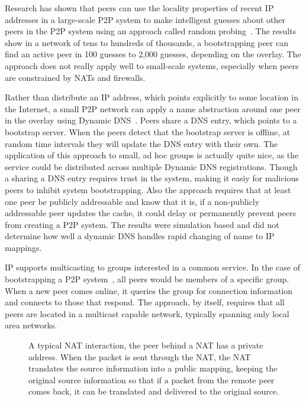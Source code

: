 \documentclass[conference]{IEEEtran}
\begin{document}
Research has shown that peers can use the locality properties of recent IP
addresses in a large-scale P2P system to make intelligent guesses about other
peers in the P2P system using an approach called random
probing~\cite{bootstrapping_p2p, locality_aware}.  The results show in a
network of tens to hundreds of thousands, a bootstrapping peer can find an
active peer in 100 guesses to 2,000 guesses, depending on the overlay.  The
approach does not really apply well to small-scale systems, especially when
peers are constrained by NATs and firewalls.

Rather than distribute an IP address, which points explicitly to some location
in the Internet, a small P2P network can apply a name abstraction around one
peer in the overlay using Dynamic DNS~\cite{bootstrapping_ddns}.  Peers share a
DNS entry, which points to a bootstrap server.  When the peers detect that the
bootstrap server is offline, at random time intervals they will update the DNS
entry with their own.  The application of this approach to small, ad hoc groups
is actually quite nice, as the service could be distributed across multiple
Dynamic DNS registrations.  Though a sharing a DNS entry requires trust in the
system, making it easiy for malicious peers to inhibit system bootstrapping.
Also the approach requires that at least one peer be publicly addressable and
know that it is, if a non-publicly addressable peer updates the cache, it could
delay or permanently prevent peers from creating a P2P system.  The results
were simulation based and did not determine how well a dynamic DNS handles
rapid changing of name to IP mappings.

IP supports multicasting to groups interested in a common service.  In the case
of bootstrapping a P2P system~\cite{pastry, locality_aware}, all peers would be
members of a specific group.  When a new peer comes online, it queries the
group for connection information and connects to those that respond.  The
approach, by itself, requires that all peers are located in a multicast capable
network, typically spanning only local area networks.

\begin{figure*}[h!t!]
\centering
{}
\caption{A typical NAT interaction, the peer behind a NAT has a private address.
When the packet is sent through the NAT, the NAT translates the source information
into a public mapping, keeping the original source information so that if a
packet from the remote peer comes back, it can be translated and delivered to
the original source.}
\label{fig:nat}
\end{figure*}
\end{document}
